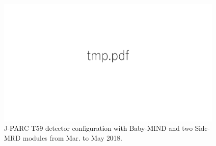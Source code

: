 \begin{figure}[tbh]
\begin{center}
\includegraphics[width=0.8\linewidth]{fig/tmp.pdf}
\end{center}
\caption{
J-PARC T59 detector configuration with Baby-MIND and two Side-MRD modules from Mar. to May 2018.
}
\label{fig:det_config_mar_may2018}
\end{figure}

